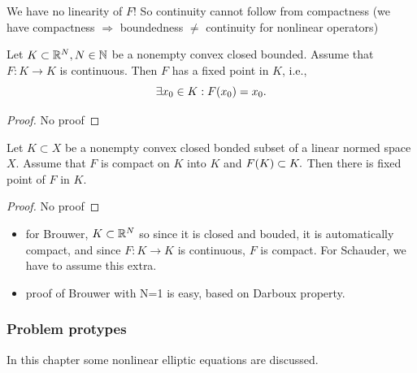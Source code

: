 \documentclass{article}
\begin{document}
\begin{remark}
	We have no linearity of $F$! So continuity cannot follow from compactness (we have compactness $\Rightarrow $ boundedness $\neq$ continuity for nonlinear operators)
\end{remark}

\begin{theorem}
	Let $K \subset {\mathbb R}^N, N \in {\mathbb N}$ be a nonempty convex closed bounded. Assume that $F: K \to K$ is continuous. Then $F$ has a fixed point in $K$, i.e.,
	\[
		\exists x_0 \in K: F\qty(x_{0}) = x_0.
	\]
\end{theorem}
\begin{proof}
	No proof
\end{proof}
\begin{theorem}
	Let $K \subset X$ be a nonempty convex closed bonded subset of a linear normed space $X$. Assume that $F$ is compact on $K$ into $K$ and $F\qty(K) \subset K.$ Then there is fixed point of $F$ in $K.$
\end{theorem}
\begin{proof}
	No proof
\end{proof}
\begin{itemize}
	\item for Brouwer, $K \subset {\mathbb R}^N$ so since it is closed and bouded, it is automatically compact, and since $F: K \to K$ is continuous, $F$ is compact. For Schauder, we have to assume this extra.
	\item proof of Brouwer with N=1 is easy, based on Darboux property.
\end{itemize}

\subsubsection{Problem protypes}
\label{sec:prototypes}

In this chapter some nonlinear elliptic equations are discussed.
\end{document}
